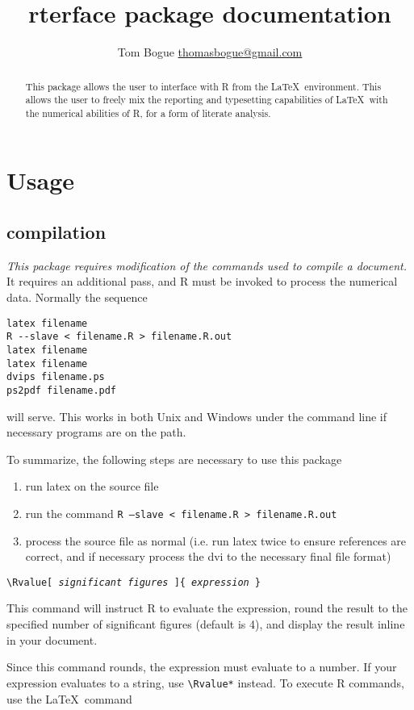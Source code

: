 \documentclass{article}
\title{rterface package documentation}
\author{Tom Bogue \url{thomasbogue@gmail.com}}
\newcommand{\DescribeMacro}[2]{\par\noindent\texttt{#1}\par\noindent#2}
\newcommand{\oarg}[1]{[ \emph{#1} ]}
\newcommand{\marg}[1]{\{ \emph{#1} \}}
\begin{document}
\maketitle

\begin{abstract}
This package allows the user to interface with R from the \LaTeX\ environment.  This allows the user to freely mix the reporting and typesetting capabilities of \LaTeX\ with the numerical abilities of R, for a form of literate analysis.
\end{abstract}

 \section{Usage}
\subsection{compilation}
\emph{This package requires modification of the commands used to compile a document.}  It requires an additional pass, and R must be invoked to process the numerical data.  Normally the sequence 
\begin{verbatim}
latex filename
R --slave < filename.R > filename.R.out
latex filename
latex filename
dvips filename.ps
ps2pdf filename.pdf
\end{verbatim}
will serve.  This works in both Unix and Windows under the command line if necessary programs are on the path.

To summarize, the following steps are necessary to use this package
\begin{enumerate}
\item run latex on the source file
\item run the command \texttt{R --slave < filename.R > filename.R.out}
\item process the source file as normal (i.e. run latex twice to ensure references are correct, and if necessary process the dvi to the necessary final file format)
\end{enumerate}

\DescribeMacro{\textbackslash{}Rvalue\oarg{significant figures}\marg{expression}}
This command will instruct R to evaluate the expression, round the result to the specified number of significant figures (default is 4), and display the result inline in your document.

Since this command rounds, the expression must evaluate to a number.  If your expression evaluates to a string, use \verb|\Rvalue*| instead.
To execute R commands, use the \LaTeX\ command
\end{document}
